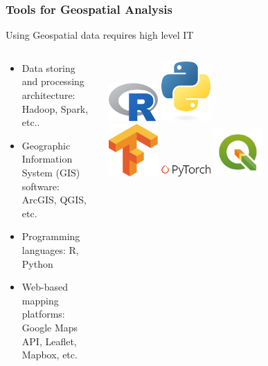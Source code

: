 \documentclass[xcolor=x11names,aspectratio=169, compress]{beamer}
\renewcommand{\(}{\begin{columns}}
\renewcommand{\)}{\end{columns}}
\newcommand{\<}[1]{\begin{column}{#1}}
\renewcommand{\>}{\end{column}}
\begin{document}
\begin{frame}
    \frametitle{Tools for Geospatial Analysis}
Using Geospatial data requires high level IT
    \begin{columns}[T]
        \begin{column}{0.5\textwidth}
            \begin{itemize}[<+->]
                \item Data storing and processing architecture: Hadoop, Spark, etc..
                \item Geographic Information System (GIS) software: ArcGIS, QGIS, etc.
                \item Programming languages: R, Python
                \item Web-based mapping platforms: Google Maps API, Leaflet, Mapbox, etc.
            \end{itemize}
        \end{column}
        \begin{column}{0.5\textwidth}
        \vspace{1cm}
            \includegraphics[width=0.2\textwidth]{R_logo.svg.png}  \includegraphics[width=0.2\textwidth]{python-logo.png} \\ \includegraphics[width=0.2\textwidth]{Tensorflow_logo.svg.png}  \includegraphics[width=0.2\textwidth]{Pytorch.png}
            \includegraphics[width=0.2\textwidth]{QGIS.jpg}
        \end{column}
    \end{columns}
\end{frame}
\end{document}
